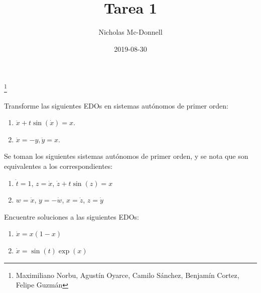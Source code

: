 \documentclass{homework}
\title{Tarea 1}
\date{2019-08-30}
\author{Nicholas Mc-Donnell}
\begin{document}
\maketitle
\thanks{Maximiliano Norbu, Agustín Oyarce, Camilo Sánchez, Benjamín Cortez, Felipe Guzmán}
\newpage
\tableofcontents
\newpage
{}
\begin{prob}
    Transforme las siguientes EDOs en sistemas autónomos de primer orden:
    \begin{enumerate}
        \item \(\ddot{x}+t\sin(\dot{x})=x\).
        \item \(\ddot{x}=-y,\ddot{y}=x\).
    \end{enumerate}
\end{prob}

\begin{sol}
    Se toman los siguientes sistemas autónomos de primer orden, y se nota que son equivalentes a los correspondientes:
    \begin{enumerate}
        \item \(\dot{t}=1\), \(z=\dot{x}\), \(\dot{z}+t\sin(z)=x\)
        \item \(w=\dot{x}\), \(y=-\dot{w}\), \(x=\dot{z}\), \(z=\dot{y}\)
    \end{enumerate}
\end{sol}

\begin{prob}
    Encuentre soluciones a las siguientes EDOs:
    \begin{enumerate}
        \item \(\dot{x}=x(1-x)\)
        \item \(\dot{x}=\sin(t)\exp(x)\)
    \end{enumerate}
\end{prob}
\end{document}
